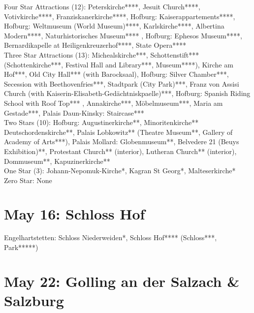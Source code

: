 Four Star Attractions (12): Peterskirche****, Jesuit Church****, Votivkirche****, Franziskanerkirche****, Hofburg: Kaiserappartements****, Hofburg: Weltmuseum (World Museum)****, Karlskirche****, Albertina Modern****, Naturhistorisches Museum**** , Hofburg: Ephesos Museum****, Bernardikapelle at Heiligenkreuzerhof****, State Opera****\\ 

Three Star Attractions (13):  Michealskirche***, Schottenstift*** (Schottenkirche***, Festival Hall and Library***, Museum****), Kirche am Hof***, Old City Hall*** (with Barocksaal), Hofburg: Silver Chamber***,  Secession with Beethovenfries***, Stadtpark (City Park)***, Franz von Assisi Church (with Kaiserin-Elisabeth-Ged\"achtniskpaelle)***, Hofburg: Spanish Riding School with Roof Top*** , Annakirche***, M\"obelmuseum***, Maria am Gestade***, Palais Daun-Kinsky: Staircase***\\

Two Stars (10): Hofburg: Augustinerkirche**, Minoritenkirche**   Deutschordenskirche**, Palais Lobkowitz** (Theatre Museum**, Gallery of Academy of Arts***), Palais Mollard: Globenmuseum**, Belvedere 21 (Beuys Exhibition)**, Protestant Church** (interior), Lutheran Church** (interior), Dommuseum**, Kapuzinerkirche**\\

One Star (3): Johann-Nepomuk-Kirche*, Kagran St Georg*, Malteserkirche*\\

Zero Star: None

\section{May 16: Schloss Hof}
\label{2021SchlossHof}

Engelhartstetten: Schloss Niederweiden*, Schloss Hof**** (Schloss***, Park*****)

\section{May 22: Golling an der Salzach \& Salzburg}
\label{2021GollingSalzburg}

